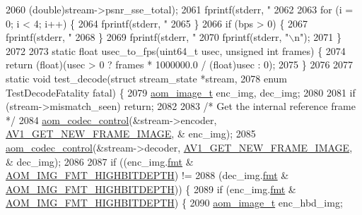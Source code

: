 \begin{DoxyCodeInclude}
{{{{{{{{{{{{{{{{{{{{{{{{{{{{{{{{{{{{{{{{{2060                        (\textcolor{keywordtype}{double})stream->psnr\_sse\_total);
2061   fprintf(stderr, \textcolor{stringliteral}{" %
2062 
2063   \textcolor{keywordflow}{for} (i = 0; i < 4; i++) \{
2064     fprintf(stderr, \textcolor{stringliteral}{" %
2065   \}
2066   \textcolor{keywordflow}{if} (bps > 0) \{
2067     fprintf(stderr, \textcolor{stringliteral}{" %
2068   \}
2069   fprintf(stderr, \textcolor{stringliteral}{" %
2070   fprintf(stderr, \textcolor{stringliteral}{"\(\backslash\)n"});
2071 \}
2072 
2073 \textcolor{keyword}{static} \textcolor{keywordtype}{float} usec\_to\_fps(uint64\_t usec, \textcolor{keywordtype}{unsigned} \textcolor{keywordtype}{int} frames) \{
2074   \textcolor{keywordflow}{return} (\textcolor{keywordtype}{float})(usec > 0 ? frames * 1000000.0 / (float)usec : 0);
2075 \}
2076 
2077 \textcolor{keyword}{static} \textcolor{keywordtype}{void} test\_decode(\textcolor{keyword}{struct} stream\_state *stream,
2078                         \textcolor{keyword}{enum} TestDecodeFatality fatal) \{
2079   \hyperlink{structaom__image}{aom\_image\_t} enc\_img, dec\_img;
2080 
2081   \textcolor{keywordflow}{if} (stream->mismatch\_seen) \textcolor{keywordflow}{return};
2082 
2083   \textcolor{comment}{/* Get the internal reference frame */}
2084   \hyperlink{group__codec_ga6da974f4eeaba1fa74106b28d0fe6ac5}{aom\_codec\_control}(&stream->encoder, \hyperlink{group__aom_gga9421a1fa78c0d9587ae5aa6c1cb3d659a410c706a34f5295996658cc5044a700f}{AV1\_GET\_NEW\_FRAME\_IMAGE}, &
      enc\_img);
2085   \hyperlink{group__codec_ga6da974f4eeaba1fa74106b28d0fe6ac5}{aom\_codec\_control}(&stream->decoder, \hyperlink{group__aom_gga9421a1fa78c0d9587ae5aa6c1cb3d659a410c706a34f5295996658cc5044a700f}{AV1\_GET\_NEW\_FRAME\_IMAGE}, &
      dec\_img);
2086 
2087   \textcolor{keywordflow}{if} ((enc\_img.\hyperlink{structaom__image_a6c64b1ab918d80d52eb8f5d6d957e825}{fmt} & \hyperlink{aom__image_8h_a607b37d91f75442f54223ecd85f1b6cb}{AOM\_IMG\_FMT\_HIGHBITDEPTH}) !=
2088       (dec\_img.\hyperlink{structaom__image_a6c64b1ab918d80d52eb8f5d6d957e825}{fmt} & \hyperlink{aom__image_8h_a607b37d91f75442f54223ecd85f1b6cb}{AOM\_IMG\_FMT\_HIGHBITDEPTH})) \{
2089     \textcolor{keywordflow}{if} (enc\_img.\hyperlink{structaom__image_a6c64b1ab918d80d52eb8f5d6d957e825}{fmt} & \hyperlink{aom__image_8h_a607b37d91f75442f54223ecd85f1b6cb}{AOM\_IMG\_FMT\_HIGHBITDEPTH}) \{
2090       \hyperlink{structaom__image}{aom\_image\_t} enc\_hbd\_img;
}}}}}}}}}}}}}}}}}}}}}}}}}}}}}}}}}}}}}}}}}}}}}
\end{DoxyCodeInclude}

